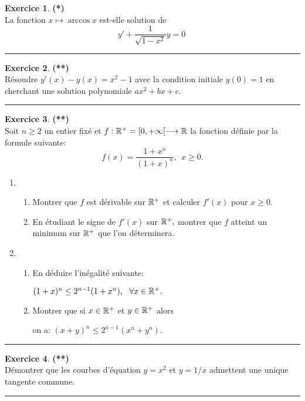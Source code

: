\documentclass[a4paper,11pt]{article}
\theoremstyle{definition}
\newtheorem{exo}{Exercice} %
\begin{document}
	\begin{exo}\textbf{(*)}\quad\\[0.2cm]
	La fonction $x \mapsto \arccos x$ est-elle solution de
	$$y'+ \dfrac{1}{\sqrt{1-x^2}}y = 0\ $$
	\centering
	\rule{1\linewidth}{0.6pt}
\end{exo}


\begin{exo}\textbf{(**)}\quad\\[0.2cm]
	Résoudre $y' (x ) - y (x ) = x^2 - 1$ avec la condition initiale $y (0) = 1 $ en cherchant une solution
	polynomiale $a x^2 + bx + c$.
	
	\centering
	\rule{1\linewidth}{0.6pt}
\end{exo}

\begin{exo}\textbf{(**)}\quad\\[0.2cm]
	Soit $n \geq 2$ un entier fix\'e et $f:\mathbb{R}^{+} = [0,
	+ \infty[ \longrightarrow \mathbb{R}$ la fonction d\'efinie par la formule
	suivante:\quad\\[-0.3cm]
	$$ f (x) = \frac{1 + x^n}{(1 + x)^n}, \ \ x \geq 0.$$
	\begin{enumerate}
		\item
		\begin{enumerate}
			\item Montrer que $f$ est d\'erivable sur $\mathbb{R}^{+}$ et calculer $f' (x)$
			pour $x \geq 0.$
			\item En \'etudiant le signe de $f' (x)$ sur $\mathbb{R}^{+},$ montrer que $f$
			atteint un minimum sur $\mathbb{R}^{+}$ que l'on d\'eterminera.
		\end{enumerate}
		\item
		\begin{enumerate}
			\item En d\'eduire l'in\'egalit\'e suivante:
			
			$ (1+ x)^n \leq 2^{n - 1} (1+ x^n), \ \ \forall x \in \R^{+}.$
			\item Montrer que si  $x \in \mathbb{R}^{+}$ et $y \in \mathbb{R}^{+}$ alors
			
			on a: $ (x + y)^n \leq 2^{n - 1} (x^n + y^n).$
		\end{enumerate}
	\end{enumerate}
	
	\centering
	\rule{1\linewidth}{0.6pt}
\end{exo}


\begin{exo}\textbf{(**)}\quad\\[0.2cm]
	Démontrer que les courbes d'équation $y=x^2$ et $y=1/x$ admettent une unique tangente commune.
	
	\centering
	\rule{1\linewidth}{0.6pt}
\end{exo}
	
\end{document}
